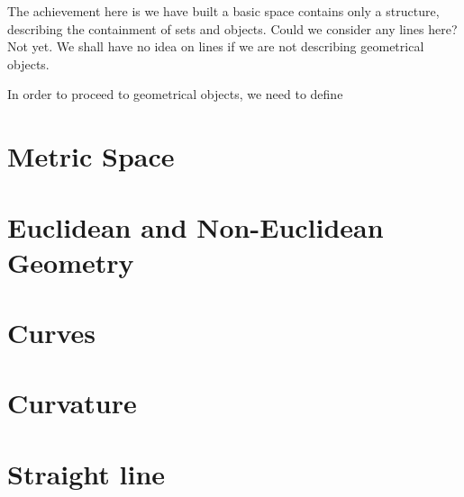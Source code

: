 \documentclass[12pt]{article}
\begin{document}
    The achievement here is we have built a basic space contains only a structure, describing the containment of sets and objects. Could we consider any lines here? Not yet. We shall have no idea on lines if we are not describing geometrical objects.

    In order to proceed to geometrical objects, we need to define

    \section{Metric Space}

    \section{Euclidean and Non-Euclidean Geometry}

    \section{Curves}

    \section{Curvature}

    \section{Straight line}
    
\end{document}
